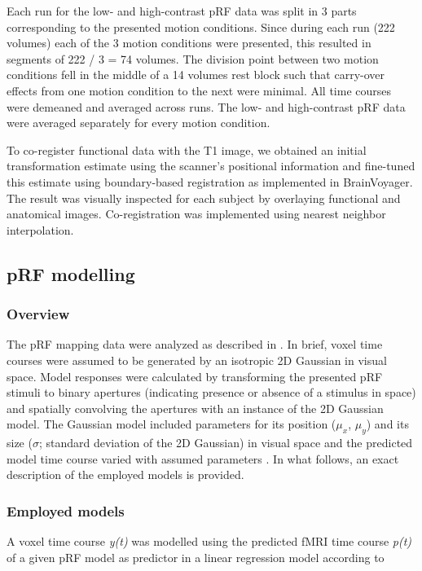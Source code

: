 Each run for the low- and high-contrast pRF data was split in 3 parts corresponding to the presented motion conditions. Since during each run (222 volumes) each of the 3 motion conditions were presented, this resulted in segments of 222 / 3 = 74 volumes. The division point between two motion conditions fell in the middle of a 14 volumes rest block such that carry-over effects from one motion condition to the next were minimal. All time courses were demeaned and averaged across runs. The low- and high-contrast pRF data were averaged separately for every motion condition.

To co-register functional data with the T1 image, we obtained an initial transformation estimate using the scanner’s positional information and fine-tuned this estimate using boundary-based registration \parencite{Greve2009} as implemented in BrainVoyager. The result was visually inspected for each subject by overlaying functional and anatomical images. Co-registration was implemented using nearest neighbor interpolation.

\subsection{pRF modelling}

\subsubsection{Overview}
The pRF mapping data were analyzed as described in \cite{Dumoulin2008, Harvey2011, Zuiderbaan2012, Kay2013, Kay2015}. In brief, voxel time courses were assumed to be generated by an isotropic 2D Gaussian in visual space. Model responses were calculated by transforming the presented pRF stimuli to binary apertures (indicating presence or absence of a stimulus in space) and spatially convolving the apertures with an instance of the 2D Gaussian model. The Gaussian model included parameters for its position ($\mu_x$, $\mu_y$) and its size ($\sigma$; standard deviation of the 2D Gaussian) in visual space and the predicted model time course varied with assumed parameters \parencite{Dumoulin2008}. In what follows, an exact description of the employed models is provided.

\subsubsection{Employed models}
A voxel time course \textit{y(t)} was modelled using the predicted fMRI time course \textit{p(t)} of a given pRF model as predictor in a linear regression model according to

